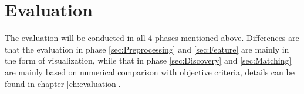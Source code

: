 \section{Evaluation}
\label{sec:Evaluation}
The evaluation will be conducted in all 4 phases mentioned above. Differences are that the evaluation in phase \ref{sec:Preprocessing} and \ref{sec:Feature} are mainly in the form of visualization, while that in phase \ref{sec:Discovery} and \ref{sec:Matching} are mainly based on numerical comparison with objective criteria, details can be found in chapter \ref{ch:evaluation}.
